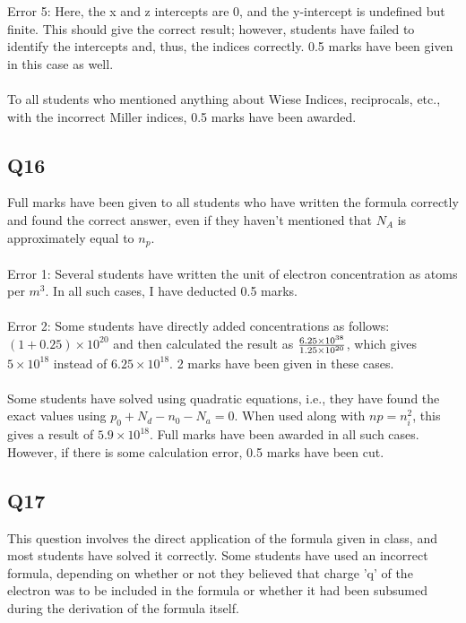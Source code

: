 \documentclass[12pt]{article}\date{}
\begin{document}
\noindent Error 5: Here, the x and z intercepts are 0, and the y-intercept is undefined but finite. This should give the correct result; however, students have failed to identify the intercepts and, thus, the indices correctly. 0.5 marks have been given in this case as well. \\
\\
To all students who mentioned anything about Wiese Indices, reciprocals, etc., with the incorrect Miller indices, 0.5 marks have been awarded. \\

\subsection{Q16}

\noindent Full marks have been given to all students who have written the formula correctly and found the correct answer, even if they haven't mentioned that $N_{A}$ is approximately equal to $n_{p}$. \\ \\
Error 1: Several students have written the unit of electron concentration as atoms per $m^3$. In all such cases, I have deducted 0.5 marks. \\
\\
Error 2: Some students have directly added concentrations as follows: $(1+0.25) \times 10^{20}$ and then calculated the result as ${6.25 \times 10^{38} \over 1.25 \times 10^{20}}$, which gives $5 \times 10^{18}$ instead of $6.25 \times 10^{18}$. 2 marks have been given in these cases. \\ \\
Some students have solved using quadratic equations, i.e., they have found the exact values using $p_0+N_d-n_0-N_a=0$. When used along with $np=n^2_i$, this gives a result of $5.9 \times 10^{18}$. Full marks have been awarded in all such cases. However, if there is some calculation error, 0.5 marks have been cut. \\

\subsection{Q17}
\noindent This question involves the direct application of the formula given in class, and most students have solved it correctly. Some students have used an incorrect formula, depending on whether or not they believed that charge 'q' of the electron was to be included in the formula or whether it had been subsumed during the derivation of the formula itself.
\end{document}
